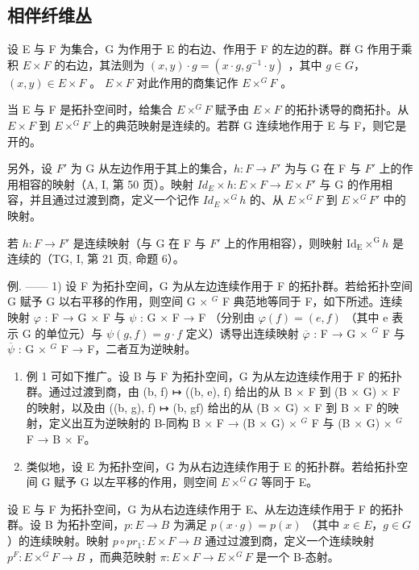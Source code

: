 \subsection{相伴纤维丛}

设 E 与 F 为集合，G 为作用于 E 的右边、作用于 F 的左边的群。群 G 作用于乘积 \(E \times F\) 的右边，其法则为 \((x, y) \cdot g = (x \cdot g, g^{-1} \cdot y)\) ，其中 \(g \in G\)，\((x, y) \in E \times F\) 。 \(E \times F\) 对此作用的商集记作 \(E \times^{G} F\) 。

当 E 与 F 是拓扑空间时，给集合 \(E \times^{G} F\) 赋予由 \(E \times F\) 的拓扑诱导的商拓扑。从 \(E \times F\) 到 \(E \times^{G} F\) 上的典范映射是连续的。若群 G 连续地作用于 E 与 F，则它是开的。

另外，设 \(F'\) 为 G 从左边作用于其上的集合，\(h: F \to F'\) 为与 G 在 F 与 \(F'\) 上的作用相容的映射（A, I, 第 50 页）。映射 \(Id_{E} \times h: E \times F \to E \times F'\) 与 G 的作用相容，并且通过过渡到商，定义一个记作 \(Id_{E} \times^{G} h\) 的、从 \(E \times^{G} F\) 到 \(E \times^{G} F'\) 中的映射。

若 \(h \colon F \to F'\) 是连续映射（与 G 在 F 与 \(F'\) 上的作用相容），则映射 \(\mathrm{Id}_{\mathrm{E}} \times^{\mathrm{G}} h\) 是连续的（TG, I, 第 21 页, 命题 6）。

例. —— 1) 设 F 为拓扑空间，G 为从左边连续作用于 F 的拓扑群。若给拓扑空间 G 赋予 G 以右平移的作用，则空间 G × \(^{G}\) F 典范地等同于 F，如下所述。连续映射 \(\varphi\) : F → G × F 与 \(\psi\) : G × F → F （分别由 \(\varphi(f) = (e, f)\) （其中 e 表示 G 的单位元）与 \(\psi(g, f) = g \cdot f\) 定义）诱导出连续映射 \(\overline{\varphi}\) : F → G × \(^{G}\) F 与 \(\overline{\psi}\) : G × \(^{G}\) F → F，二者互为逆映射。

\begin{enumerate}
\def\labelenumi{\arabic{enumi})}
\setcounter{enumi}{1}
\item
  例 1 可如下推广。设 B 与 F 为拓扑空间，G 为从左边连续作用于 F 的拓扑群。通过过渡到商，由 (b, f) ↦ ((b, e), f) 给出的从 B × F 到 (B × G) × F 的映射，以及由 ((b, g), f) ↦ (b, gf) 给出的从 (B × G) × F 到 B × F 的映射，定义出互为逆映射的 B-同构 B × F → (B × G) × \(^{G}\) F 与 (B × G) × \(^{G}\) F → B × F。
\item
  类似地，设 E 为拓扑空间，G 为从右边连续作用于 E 的拓扑群。若给拓扑空间 G 赋予 G 以左平移的作用，则空间 \(E \times^{G} G\) 等同于 E。
\end{enumerate}

设 E 与 F 为拓扑空间，G 为从右边连续作用于 E、从左边连续作用于 F 的拓扑群。设 B 为拓扑空间，\(p\colon E \to B\) 为满足 \(p(x \cdot g) = p(x)\) （其中 \(x \in E\)，\(g \in G\)）的连续映射。映射 \(p \circ pr_{1}\colon E \times F \to B\) 通过过渡到商，定义一个连续映射 \(p^{F}\colon E \times^{G} F \to B\) ，而典范映射 \(\pi\colon E \times F \to E \times^{G} F\) 是一个 B-态射。

